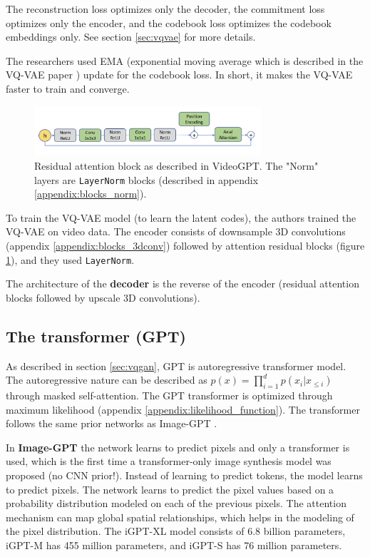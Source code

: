 The reconstruction loss optimizes only the decoder, the commitment loss optimizes only the encoder, and the codebook loss optimizes the codebook embeddings only. See section \ref{sec:vqvae} for more details.

The researchers used EMA (exponential moving average which is described in the VQ-VAE paper \cite{vqvae}) update for the codebook loss. In short, it makes the VQ-VAE faster to train and converge.

\begin{figure}
    \centering
    \includegraphics[width=0.75\textwidth]{images/video_synthesis/videogpt_res_atten_block.png}
    \caption{Residual attention block as described in VideoGPT. The "Norm" layers are \texttt{LayerNorm} blocks (described in appendix \ref{appendix:blocks_norm}).}
    \label{fig:videogpt_res_atten_block}
\end{figure}

To train the VQ-VAE model (to learn the latent codes), the authors trained the VQ-VAE on video data. The encoder consists of downsample 3D convolutions (appendix \ref{appendix:blocks_3dconv}) followed by attention residual blocks (figure \ref{fig:videogpt_res_atten_block}), and they used \texttt{LayerNorm}.

The architecture of the \textbf{decoder} is the reverse of the encoder (residual attention blocks followed by upscale 3D convolutions).

\subsection*{The transformer (GPT)}

As described in section \ref{sec:vqgan}, GPT is autoregressive transformer model. The autoregressive nature can be described as $p(x) = \prod_{i=1}^{d} p(x_i | x_{\leq i})$ through masked self-attention. The GPT transformer is optimized through maximum likelihood (appendix \ref{appendix:likelihood_function}). The transformer follows the same prior networks as Image-GPT \cite{imagegpt}.

In \textbf{Image-GPT} the network learns to predict pixels and only a transformer is used, which is the first time a transformer-only image synthesis model was proposed (no CNN prior!). Instead of learning to predict tokens, the model learns to predict pixels. The network learns to predict the pixel values based on a probability distribution modeled on each of the previous pixels. The attention mechanism can map global spatial relationships, which helps in the modeling of the pixel distribution. The iGPT-XL model consists of 6.8 billion parameters, iGPT-M has 455 million parameters, and iGPT-S has 76 million parameters. 

